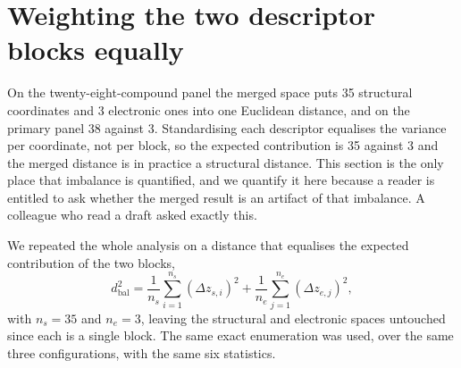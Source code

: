 \documentclass[11pt,a4paper]{article}
\begin{document}
\section{Weighting the two descriptor blocks equally}
\label{res:blockbalance}

On the twenty-eight-compound panel the merged space puts 35 structural
coordinates and 3 electronic ones into one Euclidean distance, and on the
primary panel 38 against 3. Standardising each descriptor equalises the variance per
coordinate, not per block, so the expected contribution is 35 against 3 and the
merged distance is in practice a structural distance. This section is the only
place that imbalance is quantified, and we quantify it here because a reader is entitled to ask whether the merged
result is an artifact of that imbalance. A colleague who read a draft asked
exactly this.

We repeated the whole analysis on a distance that equalises the expected
contribution of the two blocks,
\begin{equation}
d_{\mathrm{bal}}^{2}=\frac{1}{n_{s}}\sum_{i=1}^{n_{s}}(\Delta z_{s,i})^{2}
 +\frac{1}{n_{e}}\sum_{j=1}^{n_{e}}(\Delta z_{e,j})^{2},
\end{equation}
with $n_{s}=35$ and $n_{e}=3$, leaving the structural and electronic spaces
untouched since each is a single block. The same exact enumeration was used, over
the same three configurations, with the same six statistics.

\begin{table}[!htb]
\centering
\caption{Equal weight per descriptor against equal weight per block, in the
merged space. Valid-match counts are identical under the two weightings on
every panel construction. The smallest $p$ is taken over the eighteen-test
family of three spaces by six statistics, and $q$ is the
Benjamini--Hochberg adjusted value of that family.}
\label{tab:blockbalance}
\small

\end{table}
\end{document}
